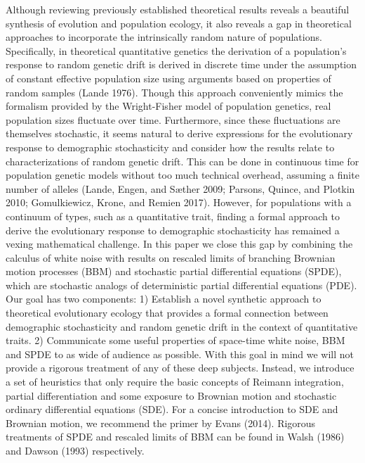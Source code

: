 \documentclass[]{article}
\begin{document}
Although reviewing previously established theoretical results reveals a
beautiful synthesis of evolution and population ecology, it also reveals
a gap in theoretical approaches to incorporate the intrinsically random
nature of populations. Specifically, in theoretical quantitative
genetics the derivation of a population's response to random genetic
drift is derived in discrete time under the assumption of constant
effective population size using arguments based on properties of random
samples (Lande 1976). Though this approach conveniently mimics the
formalism provided by the Wright-Fisher model of population genetics,
real population sizes fluctuate over time. Furthermore, since these
fluctuations are themselves stochastic, it seems natural to derive
expressions for the evolutionary response to demographic stochasticity
and consider how the results relate to characterizations of random
genetic drift. This can be done in continuous time for population
genetic models without too much technical overhead, assuming a finite
number of alleles (Lande, Engen, and Sæther 2009; Parsons, Quince, and
Plotkin 2010; Gomulkiewicz, Krone, and Remien 2017). However, for
populations with a continuum of types, such as a quantitative trait,
finding a formal approach to derive the evolutionary response to
demographic stochasticity has remained a vexing mathematical challenge.
In this paper we close this gap by combining the calculus of white noise
with results on rescaled limits of branching Brownian motion processes
(BBM) and stochastic partial differential equations (SPDE), which are
stochastic analogs of deterministic partial differential equations
(PDE). Our goal has two components: 1) Establish a novel synthetic
approach to theoretical evolutionary ecology that provides a formal
connection between demographic stochasticity and random genetic drift in
the context of quantitative traits. 2) Communicate some useful
properties of space-time white noise, BBM and SPDE to as wide of
audience as possible. With this goal in mind we will not provide a
rigorous treatment of any of these deep subjects. Instead, we introduce
a set of heuristics that only require the basic concepts of Reimann
integration, partial differentiation and some exposure to Brownian
motion and stochastic ordinary differential equations (SDE). For a
concise introduction to SDE and Brownian motion, we recommend the primer
by Evans (2014). Rigorous treatments of SPDE and rescaled limits of BBM
can be found in Walsh (1986) and Dawson (1993) respectively.
\end{document}
